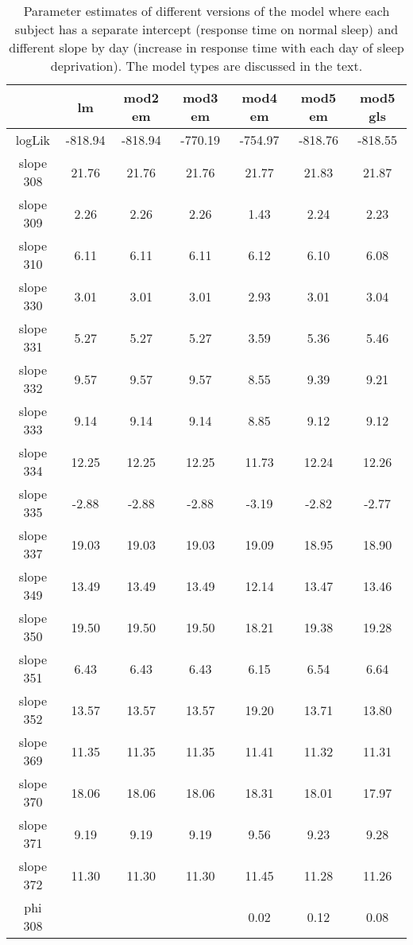 \begin{table}[htp]
\centering
\caption{Parameter estimates of different versions of the model where each subject has a separate intercept (response time on normal sleep) and different slope by day (increase in response time with each day of sleep deprivation).  The model types are discussed in the text.} 
\label{ref:tablesleepstudy}
\begin{tabular}{ccccccc}
  \hline
 & lm & mod2 em & mod3 em & mod4 em & mod5 em & mod5 gls \\ 
  \hline
logLik & -818.94 & -818.94 & -770.19 & -754.97 & -818.76 & -818.55 \\ 
  slope 308 & 21.76 & 21.76 & 21.76 & 21.77 & 21.83 & 21.87 \\ 
  slope 309 & 2.26 & 2.26 & 2.26 & 1.43 & 2.24 & 2.23 \\ 
  slope 310 & 6.11 & 6.11 & 6.11 & 6.12 & 6.10 & 6.08 \\ 
  slope 330 & 3.01 & 3.01 & 3.01 & 2.93 & 3.01 & 3.04 \\ 
  slope 331 & 5.27 & 5.27 & 5.27 & 3.59 & 5.36 & 5.46 \\ 
  slope 332 & 9.57 & 9.57 & 9.57 & 8.55 & 9.39 & 9.21 \\ 
  slope 333 & 9.14 & 9.14 & 9.14 & 8.85 & 9.12 & 9.12 \\ 
  slope 334 & 12.25 & 12.25 & 12.25 & 11.73 & 12.24 & 12.26 \\ 
  slope 335 & -2.88 & -2.88 & -2.88 & -3.19 & -2.82 & -2.77 \\ 
  slope 337 & 19.03 & 19.03 & 19.03 & 19.09 & 18.95 & 18.90 \\ 
  slope 349 & 13.49 & 13.49 & 13.49 & 12.14 & 13.47 & 13.46 \\ 
  slope 350 & 19.50 & 19.50 & 19.50 & 18.21 & 19.38 & 19.28 \\ 
  slope 351 & 6.43 & 6.43 & 6.43 & 6.15 & 6.54 & 6.64 \\ 
  slope 352 & 13.57 & 13.57 & 13.57 & 19.20 & 13.71 & 13.80 \\ 
  slope 369 & 11.35 & 11.35 & 11.35 & 11.41 & 11.32 & 11.31 \\ 
  slope 370 & 18.06 & 18.06 & 18.06 & 18.31 & 18.01 & 17.97 \\ 
  slope 371 & 9.19 & 9.19 & 9.19 & 9.56 & 9.23 & 9.28 \\ 
  slope 372 & 11.30 & 11.30 & 11.30 & 11.45 & 11.28 & 11.26 \\ 
  phi 308 &  &  &  & 0.02 & 0.12 & 0.08 \\ 

\end{tabular}
\end{table}
